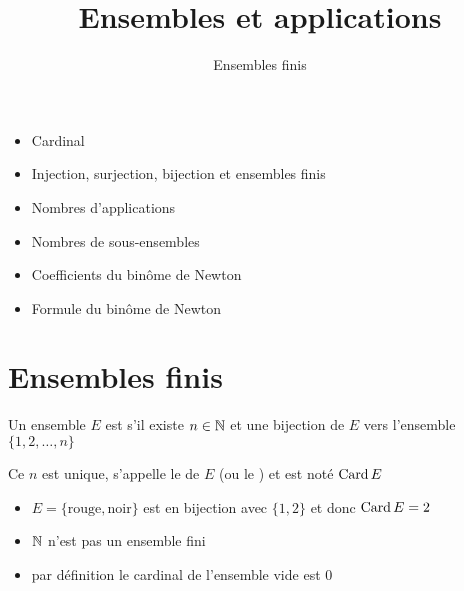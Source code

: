






\title{{\bf Ensembles et applications}}
\subtitle{Ensembles finis}

\begin{frame}
  
  \debutmontitre

  \pause

{\footnotesize
\hfill
{}
\begin{minipage}{0.6\textwidth}
  \begin{itemize}
    \item<3-> Cardinal
    \item<4-> Injection, surjection, bijection et ensembles finis
    \item<5-> Nombres d'applications
    \item<6-> Nombres de sous-ensembles
    \item<7-> Coefficients du binôme de Newton
    \item<8-> Formule du binôme de Newton
  \end{itemize}
\end{minipage}
}

\end{frame}

\setcounter{framenumber}{0}




\section{Ensembles finis}

\begin{frame}


\begin{mydefinition}
Un ensemble $E$ est  s'il existe $n\in \mathbb{N}$ et
une bijection de $E$ vers l'ensemble $\{1,2,\ldots,n\}$

\pause

Ce $n$ est unique, s'appelle le  de $E$ (ou le )
et est noté $\mathop{\text{Card}}\nolimits E$
\end{mydefinition}

\pause
\bigskip


\begin{itemize}
  \item $E=\{\text{rouge},\text{noir}\}$ est en bijection avec $\{1,2\}$ et donc $\mathop{\text{Card}}\nolimits E =2$
\pause
  \item $\mathbb{N}$ n'est pas un ensemble fini
\pause
  \item par définition le cardinal de l'ensemble vide est $0$
\end{itemize}
\end{frame}


